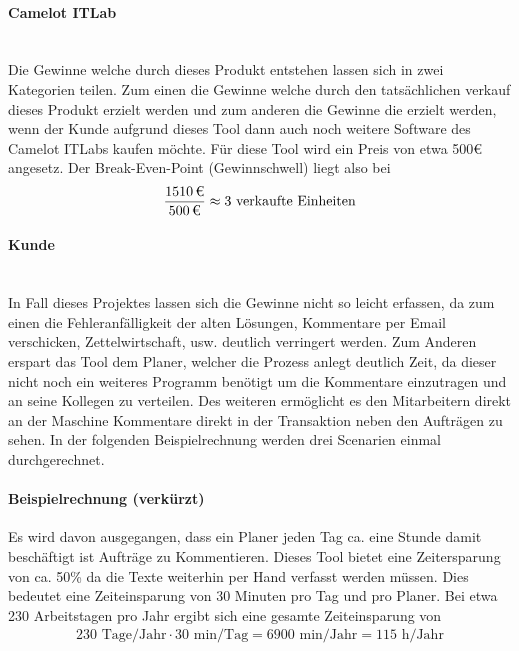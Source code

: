 \paragraph{Camelot ITLab}\mbox{} \\
Die Gewinne welche durch dieses Produkt entstehen lassen sich in zwei Kategorien teilen. Zum einen die Gewinne welche durch den tatsächlichen verkauf dieses Produkt erzielt werden und zum anderen die Gewinne die erzielt werden, wenn der Kunde aufgrund dieses Tool dann auch noch weitere Software des Camelot ITLabs kaufen möchte. Für diese Tool wird ein Preis von etwa 500€ angesetz. Der Break-Even-Point (Gewinnschwell) liegt also bei
\begin{eqnarray}
\frac{\eur{1510}}{\eur{500}} \approx 3 \mbox{ verkaufte Einheiten} 
\end{eqnarray}

\paragraph{Kunde}\mbox{} \\
In Fall dieses Projektes lassen sich die Gewinne nicht so leicht erfassen, da zum einen die Fehleranfälligkeit der alten Lösungen, Kommentare per Email verschicken, Zettelwirtschaft, usw. deutlich verringert werden. Zum Anderen erspart das Tool dem Planer, welcher die Prozess anlegt deutlich Zeit, da dieser nicht noch ein weiteres Programm benötigt um die Kommentare einzutragen und an seine Kollegen zu verteilen. Des weiteren ermöglicht es den Mitarbeitern direkt an der Maschine Kommentare direkt in der Transaktion neben den Aufträgen zu sehen. In der folgenden Beispielrechnung werden drei Scenarien einmal durchgerechnet. 

\paragraph{Beispielrechnung (verkürzt)}
Es wird davon ausgegangen, dass ein Planer jeden Tag ca. eine Stunde damit beschäftigt ist Aufträge zu Kommentieren. Dieses Tool bietet eine Zeitersparung von ca. 50\% da die Texte weiterhin per Hand verfasst werden müssen. Dies bedeutet eine Zeiteinsparung von 30 Minuten pro Tag und pro Planer. Bei etwa 230 Arbeitstagen pro Jahr ergibt sich eine gesamte Zeiteinsparung von  
\begin{eqnarray}
230 \mbox{ Tage/Jahr} \cdot 30 \mbox{ min/Tag} = 6900 \mbox{ min/Jahr} = 115 \mbox{ h/Jahr} 
\end{eqnarray}

